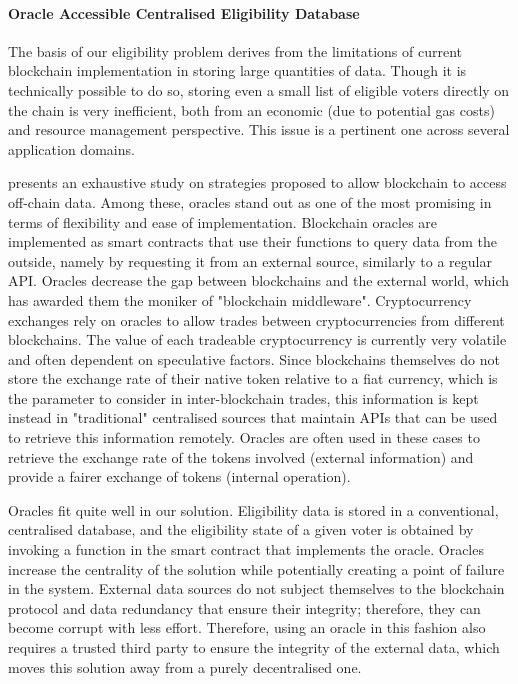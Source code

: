 \documentclass[../main.tex]{subfiles}
\begin{document}
\paragraph{Oracle Accessible Centralised Eligibility Database}
\label{sec:centralised_eligibility_database}
The basis of our eligibility problem derives from the limitations of current blockchain implementation in storing large quantities of data. Though it is technically possible to do so, storing even a small list of eligible voters directly on the chain is very inefficient, both from an economic (due to potential gas costs) and resource management perspective. This issue is a pertinent one across several application domains.
\par
\cite{Ezzat2022} presents an exhaustive study on strategies proposed to allow blockchain to access off-chain data. Among these, oracles stand out as one of the most promising in terms of flexibility and ease of implementation. Blockchain oracles are implemented as smart contracts that use their functions to query data from the outside, namely by requesting it from an external source, similarly to a regular API. Oracles decrease the gap between blockchains and the external world, which has awarded them the moniker of "blockchain middleware". Cryptocurrency exchanges rely on oracles to allow trades between cryptocurrencies from different blockchains. The value of each tradeable cryptocurrency is currently very volatile and often dependent on speculative factors. Since blockchains themselves do not store the exchange rate of their native token relative to a fiat currency, which is the parameter to consider in inter-blockchain trades, this information is kept instead in "traditional" centralised sources that maintain APIs that can be used to retrieve this information remotely. Oracles are often used in these cases to retrieve the exchange rate of the tokens involved (external information) and provide a fairer exchange of tokens (internal operation).
\par
Oracles fit quite well in our solution. Eligibility data is stored in a conventional, centralised database, and the eligibility state of a given voter is obtained by invoking a function in the smart contract that implements the oracle. Oracles increase the centrality of the solution while potentially creating a point of failure in the system. External data sources do not subject themselves to the blockchain protocol and data redundancy that ensure their integrity; therefore, they can become corrupt with less effort. Therefore, using an oracle in this fashion also requires a trusted third party to ensure the integrity of the external data, which moves this solution away from a purely decentralised one.
\end{document}

